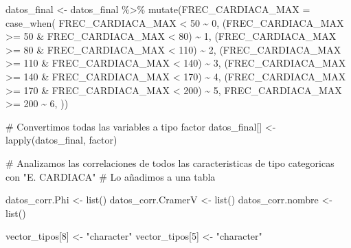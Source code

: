 \documentclass[
]{article}
\newenvironment{Shaded}{\begin{snugshade}}{\end{snugshade}}
\newcommand{\AttributeTok}[1]{\textcolor[rgb]{0.80,0.80,0.80}{#1}}
\newcommand{\CommentTok}[1]{\textcolor[rgb]{0.50,0.62,0.50}{#1}}
\newcommand{\DecValTok}[1]{\textcolor[rgb]{0.86,0.86,0.80}{#1}}
\newcommand{\FunctionTok}[1]{\textcolor[rgb]{0.94,0.94,0.56}{#1}}
\newcommand{\NormalTok}[1]{\textcolor[rgb]{0.80,0.80,0.80}{#1}}
\newcommand{\OtherTok}[1]{\textcolor[rgb]{0.94,0.94,0.56}{#1}}
\newcommand{\SpecialCharTok}[1]{\textcolor[rgb]{0.86,0.64,0.64}{#1}}
\newcommand{\StringTok}[1]{\textcolor[rgb]{0.80,0.58,0.58}{#1}}
\begin{document}
\begin{Shaded}
\begin{Highlighting}[]
\NormalTok{datos\_final }\OtherTok{\textless{}{-}}\NormalTok{ datos\_final }\SpecialCharTok{\%\textgreater{}\%} \FunctionTok{mutate}\NormalTok{(}\AttributeTok{FREC\_CARDIACA\_MAX =} \FunctionTok{case\_when}\NormalTok{(}
\NormalTok{  FREC\_CARDIACA\_MAX }\SpecialCharTok{\textless{}} \DecValTok{50} \SpecialCharTok{\textasciitilde{}} \DecValTok{0}\NormalTok{,}
\NormalTok{  (FREC\_CARDIACA\_MAX }\SpecialCharTok{\textgreater{}=} \DecValTok{50} \SpecialCharTok{\&}\NormalTok{ FREC\_CARDIACA\_MAX }\SpecialCharTok{\textless{}} \DecValTok{80}\NormalTok{) }\SpecialCharTok{\textasciitilde{}} \DecValTok{1}\NormalTok{,}
\NormalTok{  (FREC\_CARDIACA\_MAX }\SpecialCharTok{\textgreater{}=} \DecValTok{80} \SpecialCharTok{\&}\NormalTok{ FREC\_CARDIACA\_MAX }\SpecialCharTok{\textless{}} \DecValTok{110}\NormalTok{) }\SpecialCharTok{\textasciitilde{}} \DecValTok{2}\NormalTok{,}
\NormalTok{  (FREC\_CARDIACA\_MAX }\SpecialCharTok{\textgreater{}=} \DecValTok{110} \SpecialCharTok{\&}\NormalTok{ FREC\_CARDIACA\_MAX }\SpecialCharTok{\textless{}} \DecValTok{140}\NormalTok{) }\SpecialCharTok{\textasciitilde{}} \DecValTok{3}\NormalTok{,}
\NormalTok{  (FREC\_CARDIACA\_MAX }\SpecialCharTok{\textgreater{}=} \DecValTok{140} \SpecialCharTok{\&}\NormalTok{ FREC\_CARDIACA\_MAX }\SpecialCharTok{\textless{}} \DecValTok{170}\NormalTok{) }\SpecialCharTok{\textasciitilde{}} \DecValTok{4}\NormalTok{,}
\NormalTok{  (FREC\_CARDIACA\_MAX }\SpecialCharTok{\textgreater{}=} \DecValTok{170} \SpecialCharTok{\&}\NormalTok{ FREC\_CARDIACA\_MAX }\SpecialCharTok{\textless{}} \DecValTok{200}\NormalTok{) }\SpecialCharTok{\textasciitilde{}} \DecValTok{5}\NormalTok{,}
\NormalTok{  FREC\_CARDIACA\_MAX }\SpecialCharTok{\textgreater{}=} \DecValTok{200} \SpecialCharTok{\textasciitilde{}} \DecValTok{6}\NormalTok{,}
\NormalTok{  ))}


\CommentTok{\# Convertimos todas las variables a tipo factor}
\NormalTok{datos\_final[] }\OtherTok{\textless{}{-}} \FunctionTok{lapply}\NormalTok{(datos\_final, factor)}

\CommentTok{\# Analizamos las correlaciones de todos las caracteristicas de tipo categoricas con "E. CARDIACA"}
\CommentTok{\# Lo añadimos a una tabla}

\NormalTok{datos\_corr.Phi }\OtherTok{\textless{}{-}} \FunctionTok{list}\NormalTok{()}
\NormalTok{datos\_corr.CramerV }\OtherTok{\textless{}{-}} \FunctionTok{list}\NormalTok{()}
\NormalTok{datos\_corr.nombre }\OtherTok{\textless{}{-}} \FunctionTok{list}\NormalTok{()}

\NormalTok{vector\_tipos[}\DecValTok{8}\NormalTok{] }\OtherTok{\textless{}{-}} \StringTok{"character"}
\NormalTok{vector\_tipos[}\DecValTok{5}\NormalTok{] }\OtherTok{\textless{}{-}} \StringTok{"character"}


\end{Highlighting}
\end{Shaded}
\end{document}
